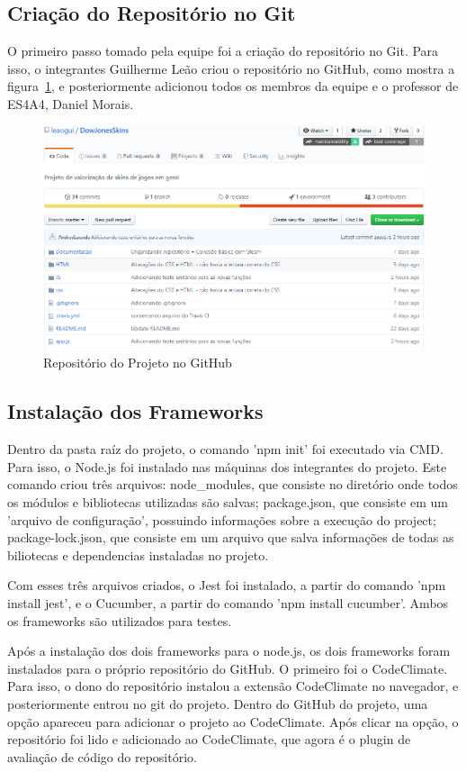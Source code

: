 \subsection{Criação do Repositório no Git}
O primeiro passo tomado pela equipe foi a criação do repositório no Git. Para isso, o integrantes
Guilherme Leão criou o repositório no GitHub, como mostra a figura~\ref{fig:github}, e posteriormente adicionou todos os membros
da equipe e o professor de ES4A4, Daniel Morais.\\
\begin{figure}[!htb]
	\centering
	\includegraphics[scale=0.6]{Imagens/Repositorio.png}
	\caption{Repositório do Projeto no GitHub}
	\label{fig:github}
\end{figure}

\subsection{Instalação dos Frameworks}
Dentro da pasta raíz do projeto, o comando 'npm init' foi executado via CMD. Para isso, o Node.js foi instalado
nas máquinas dos integrantes do projeto. Este comando criou três arquivos: node\_modules, que consiste no diretório onde todos
os módulos e bibliotecas utilizadas são salvas; package.json, que consiste em um 'arquivo de configuração',
possuindo informações sobre a execução do project; package-lock.json, que consiste em um arquivo que salva
informações de todas as biliotecas e dependencias instaladas no projeto.

Com esses três arquivos criados, o Jest foi instalado, a partir do comando 'npm install jest', e o Cucumber, a partir
do comando 'npm install cucumber'. Ambos os frameworks são utilizados para testes.

Após a instalação dos dois frameworks para o node.js, os dois frameworks foram instalados para o próprio repositório do GitHub.
O primeiro foi o CodeClimate. Para isso, o dono do repositório instalou a extensão CodeClimate no navegador,
e posteriormente entrou no git do projeto. Dentro do GitHub do projeto, uma opção apareceu para adicionar
o projeto ao CodeClimate. Após clicar na opção, o repositório foi lido e adicionado ao CodeClimate, 
que agora é o plugin de avaliação de código do repositório.

